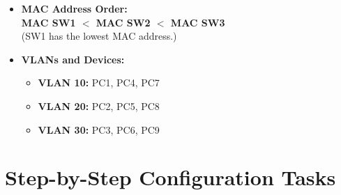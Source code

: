 \documentclass[a4paper]{book}
\begin{document}
\begin{itemize}
    \item \textbf{MAC Address Order:} \\
    \textbf{MAC SW1 $<$ MAC SW2 $<$ MAC SW3} \\
    (SW1 has the lowest MAC address.)
    
    \item \textbf{VLANs and Devices:}
    \begin{itemize}
        \item \textbf{VLAN 10:} PC1, PC4, PC7
        \item \textbf{VLAN 20:} PC2, PC5, PC8
        \item \textbf{VLAN 30:} PC3, PC6, PC9
    \end{itemize}
\end{itemize}

\section*{Step-by-Step Configuration Tasks}
\end{document}
